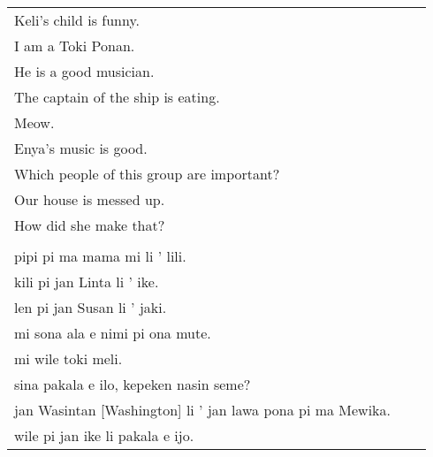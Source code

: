 \begin{supertabular}{p{5,5cm}|ll}
Keli's child is funny.    \\ %
I am a Toki Ponan.   \\  %
He is a good musician.   \\  %
The captain of the ship is eating.    \\ %
Meow.    \\ %
Enya's music is good.    \\ %
Which people of this group are important?    \\ %
Our house is messed up.    \\ %
How did she make that?    \\ %
 && \\ %
pipi pi ma mama mi li ' lili.  \\ %
kili pi jan Linta li ' ike.    \\ %
len pi jan Susan li ' jaki.    \\ %
mi sona ala e nimi pi ona mute.    \\ %
mi wile toki meli.    \\ %
sina pakala e ilo, kepeken nasin seme?    \\ %
jan Wasintan [Washington] li ' jan lawa pona pi ma Mewika.  \\   %
wile pi jan ike li pakala e ijo.    \\ %
\end{supertabular}  
